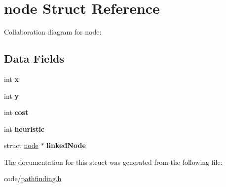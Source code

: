 \hypertarget{structnode}{}\section{node Struct Reference}
\label{structnode}


Collaboration diagram for node\+:
\subsection*{Data Fields}
\begin{DoxyCompactItemize}
\item 
int {\bfseries x}\hypertarget{structnode_a64dd8b65a7d38c632a017d7f36444dbb}{}\label{structnode_a64dd8b65a7d38c632a017d7f36444dbb}

\item 
int {\bfseries y}\hypertarget{structnode_ae944a3a75efb9856fa5c6f2221e2b49e}{}\label{structnode_ae944a3a75efb9856fa5c6f2221e2b49e}

\item 
int {\bfseries cost}\hypertarget{structnode_a20e2ef0504cf3cfeb69ccba908ee5c28}{}\label{structnode_a20e2ef0504cf3cfeb69ccba908ee5c28}

\item 
int {\bfseries heuristic}\hypertarget{structnode_a3be0d7ff6cc3b92a780d42056ab6467c}{}\label{structnode_a3be0d7ff6cc3b92a780d42056ab6467c}

\item 
struct \hyperlink{structnode}{node} $\ast$ {\bfseries linked\+Node}\hypertarget{structnode_a85b8458e6efcf35eed2537799110b11a}{}\label{structnode_a85b8458e6efcf35eed2537799110b11a}

\end{DoxyCompactItemize}


The documentation for this struct was generated from the following file\+:\begin{DoxyCompactItemize}
\item 
code/\hyperlink{pathfinding_8h}{pathfinding.\+h}\end{DoxyCompactItemize}
